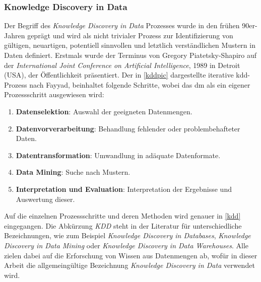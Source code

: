 \subsubsection{Knowledge Discovery in Data}
\label{dmkdd}

Der Begriff des \textit{Knowledge Discovery in Data} Prozesses wurde in den frühen 90er-Jahren geprägt und wird als \glqq nicht trivialer Prozess zur Identifizierung von gültigen, neuartigen, potentiell sinnvollen und letztlich verständlichen Mustern in Daten\grqq{} definiert. Erstmals wurde der Terminus von Gregory Piatetsky-Shapiro auf der \textit{International Joint Conference on Artificial Intelligence}, 1989 in Detroit (USA), der Öffentlichkeit präsentiert. Der in \vref{kddpic} dargestellte iterative \gls{kdd}-Prozess nach Fayyad, beinhaltet folgende Schritte, wobei das \gls{dm} als ein eigener Prozessschritt ausgewiesen wird:

\begin{enumerate}

\item \textbf{Datenselektion}: Auswahl der geeigneten Datenmengen.
\item \textbf{Datenvorverarbeitung}: Behandlung fehlender oder problembehafteter Daten.
\item \textbf{Datentransformation}: Umwandlung in adäquate Datenformate.
\item \textbf{Data Mining}: Suche nach Mustern.
\item \textbf{Interpretation und Evaluation}: Interpretation der Ergebnisse und Auswertung dieser.

\end{enumerate}

Auf die einzelnen Prozessschritte und deren Methoden wird genauer in \vref{kdd} eingegangen. Die Abkürzung \textit{KDD} steht in der Literatur für unterschiedliche Bezeichnungen, wie zum Beispiel \textit{Knowledge Discovery in Databases}, \textit{Knowledge Discovery in Data Mining} oder \textit{Knowledge Discovery in Data Warehouses}. Alle zielen dabei auf die Erforschung von Wissen aus Datenmengen ab, wofür in dieser Arbeit die allgemeingültige Bezeichnung \textit{Knowledge Discovery in Data} verwendet wird.

